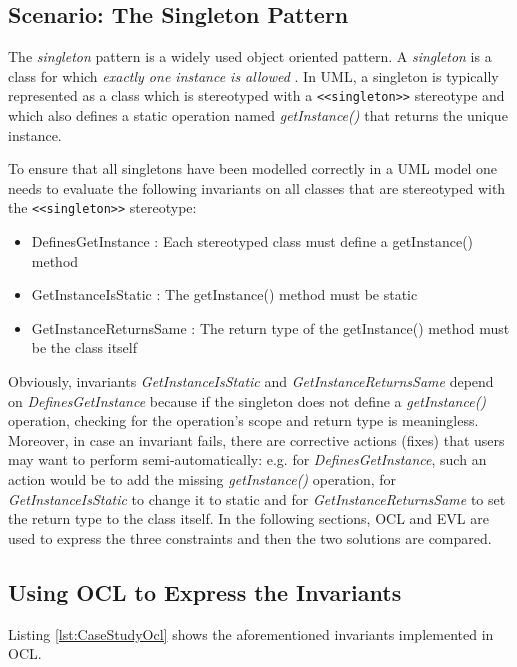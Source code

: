 \subsection{Scenario: The Singleton Pattern}

The \emph{singleton} pattern is a widely used object oriented pattern. A \emph{singleton} is a class for which \emph{exactly one instance is allowed} \cite{Larman}. In UML, a singleton is typically represented as a class which is stereotyped with a \verb|<<singleton>>| stereotype and which also defines a static operation named \emph{getInstance()} that returns the unique instance. 

To ensure that all singletons have been modelled correctly in a UML model one needs to evaluate the following invariants on all classes that are stereotyped with the \verb|<<singleton>>| stereotype:

\begin{itemize}
	\item DefinesGetInstance : Each stereotyped class must define a getInstance() method
	\item GetInstanceIsStatic : The getInstance() method must be static
	\item GetInstanceReturnsSame : The return type of the getInstance() method must be the class itself 
\end{itemize}

Obviously, invariants \emph{GetInstanceIsStatic} and \emph{GetInstanceReturnsSame} depend on \emph{DefinesGetInstance} because if the singleton does not define a \emph{getInstance()} operation, checking for the operation's scope and return type is meaningless. Moreover, in case an invariant fails, there are corrective actions (fixes) that users may want to perform semi-automatically: e.g. for \emph{DefinesGetInstance}, such an action would be to add the missing \emph{getInstance()} operation, for \emph{GetInstanceIsStatic} to change it to static and for \emph{GetInstanceReturnsSame} to set the return type to the class itself. In the following sections, OCL and EVL are used to express the three constraints and then the two solutions are compared.

\subsection{Using OCL to Express the Invariants}

Listing \ref{lst:CaseStudyOcl} shows the aforementioned invariants implemented in OCL.


